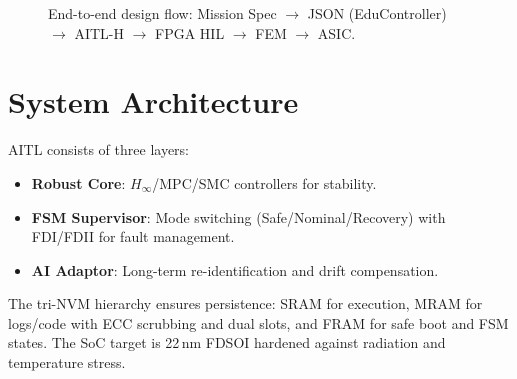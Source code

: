 \documentclass[conference]{IEEEtran}
\begin{document}
\begin{figure}[!t]
\centering
{}
\caption{End-to-end design flow: Mission Spec $\to$ JSON (EduController) $\to$ AITL-H $\to$ FPGA HIL $\to$ FEM $\to$ ASIC.}
\label{fig:flow}
\end{figure}
\FloatBarrier

\section{System Architecture}
AITL consists of three layers:
\begin{itemize}
  \item \textbf{Robust Core}: $H_\infty$/MPC/SMC controllers for stability.
  \item \textbf{FSM Supervisor}: Mode switching (Safe/Nominal/Recovery) with FDI/FDII for fault management.
  \item \textbf{AI Adaptor}: Long-term re-identification and drift compensation.
\end{itemize}

The tri-NVM hierarchy ensures persistence: SRAM for execution, MRAM for logs/code with ECC scrubbing and dual slots, and FRAM for safe boot and FSM states. The SoC target is 22\,nm FD\!SOI hardened against radiation and temperature stress.
\end{document}
